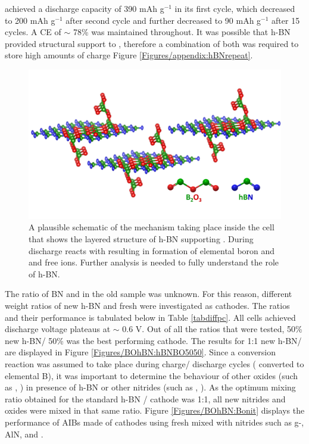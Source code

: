  achieved a discharge capacity of 390 mAh g$^{-1}$ in its first cycle, which decreased to 200 mAh g$^{-1}$ after second cycle and further decreased to 90 mAh g$^{-1}$ after 15 cycles. A CE of $\sim$ 78\% was maintained throughout. It was possible that h-BN provided structural support to , therefore a combination of both was required to store high amounts of charge Figure \ref{Figures/appendix:hBNrepeat}. 

\begin{figure}[tbh!]
\centering
\includegraphics[width=\textwidth]{Figures/BOhBN/BonhBN}
\caption{A plausible schematic of the mechanism taking place inside the cell that shows the layered structure of h-BN supporting . During discharge  reacts with  resulting in formation of elemental boron and  and free  ions. Further analysis is needed to fully understand the role of h-BN.}
\label{Figures/BOhBN:BohBN}
\end{figure}

The ratio of BN  and  in the old sample was unknown. For this reason, different weight ratios of new h-BN and fresh  were investigated as cathodes. The ratios and their performance is tabulated below in Table \ref{tabdiffpc}. All cells achieved discharge voltage plateaus at $\sim$ 0.6 V. Out of all the ratios that were tested, 50\% new h-BN/ 50\%  was the best performing cathode. The results for 1:1 new h-BN/ are displayed in Figure \ref{Figures/BOhBN:hBNBO5050}. Since a conversion reaction was assumed to take place during charge/ discharge cycles ( converted to elemental B), it was important to determine the behaviour of other oxides (such as , ) in presence of h-BN or other nitrides (such as , ). As the optimum mixing ratio obtained for the standard h-BN / cathode was 1:1, all new nitrides and oxides were mixed in that same ratio. Figure \ref{Figures/BOhBN:Bonit} displays the performance of AIBs made of cathodes using fresh  mixed with nitrides such as g-, AlN, and  . 

